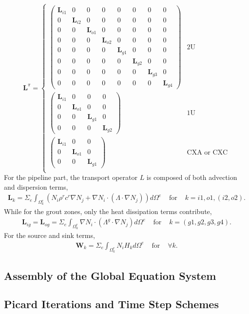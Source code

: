 \begin{equation}
\bm{L}^\pi = \left\{ \begin{array}{ll}
\left( \begin{array}{cccccccc}
\bm{L}_{i1} & 0 & 0 & 0 & 0 & 0 & 0 & 0 \\
0 & \bm{L}_{i2} & 0 & 0 & 0 & 0 & 0 & 0 \\
0 & 0 & \bm{L}_{o1} & 0 & 0 & 0 & 0 & 0 \\
0 & 0 & 0 & \bm{L}_{o2} & 0 & 0 & 0 & 0 \\
0 & 0 & 0 & 0 & \bm{L}_{g1} & 0 & 0 & 0 \\
0 & 0 & 0 & 0 & 0 & \bm{L}_{g2} & 0 & 0 \\
0 & 0 & 0 & 0 & 0 & 0 & \bm{L}_{g3} & 0 \\
0 & 0 & 0 & 0 & 0 & 0 & 0 & \bm{L}_{g4} \end{array} \right)
  & \mbox{2U} \\
\left( \begin{array}{cccc}
\bm{L}_{i1} & 0 & 0 & 0  \\
0 & \bm{L}_{o1} & 0 & 0  \\
0 & 0 & \bm{L}_{g1} & 0  \\
0 & 0 & 0 & \bm{L}_{g2}  \end{array} \right)
 & \mbox{1U} \\
\left( \begin{array}{ccc}
\bm{L}_{i1} & 0 & 0  \\
0 & \bm{L}_{o1} & 0  \\
0 & 0 & \bm{L}_{g1}  \end{array} \right)
 & \mbox{CXA or CXC} \\
       \end{array} \right.
\end{equation}
For the pipeline part, the transport operator $L$ is composed of both advection and dispersion terms, 
\begin{equation}
\begin{array}{lll}
\bm{L}_k = \Sigma_{e} \int_{\Omega_k^e} \left( N_i \rho^r c^r \nabla N_j 
+ \nabla N_i \cdot ( \Lambda \cdot \nabla N_j ) \right) d\Omega^e 
&\mbox{~for~}& k = i1, o1, (i2, o2). 
\end{array}
\end{equation}
While for the grout zones, only the heat dissipation terms contribute, 
\begin{equation}
\begin{array}{lll}
\bm{L}_{ig} = \bm{L}_{og} = \Sigma_{e} \int_{\Omega_k^e} \nabla N_i \cdot ( \Lambda^g \cdot \nabla N_j ) d\Omega^e 
&\mbox{~for~}& k = (g1, g2, g3, g4). 
\end{array}
\end{equation}
For the source and sink terms, 
\begin{equation}
\begin{array}{lll}
\bm{W}_{k} = \Sigma_{e} \int_{\Omega_k^e} N_i H_k d\Omega^e 
&\mbox{~for~}& \forall k. 
\end{array}
\end{equation}

\subsection{Assembly of the Global Equation System}



\subsection{Picard Iterations and Time Step Schemes}